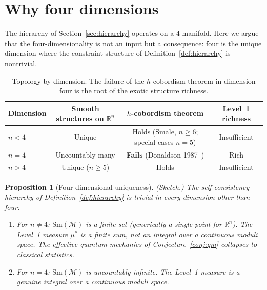 \documentclass[12pt,a4paper]{article}
\newtheorem{proposition}{Proposition}
\theoremstyle{definition}
\theoremstyle{remark}
\begin{document}
\section{Why four dimensions}
\label{sec:dimensions}

The hierarchy of Section~\ref{sec:hierarchy} operates on a 4-manifold.
Here we argue that the four-dimensionality is not an input but a
consequence: four is the unique dimension where the constraint structure
of Definition~\ref{def:hierarchy} is nontrivial.

\begin{table}[h]
\centering
\begin{tabular}{lccc}
\toprule
Dimension & Smooth structures on $\mathbb{R}^n$ & $h$-cobordism theorem & Level~1 richness \\
\midrule
$n < 4$ & Unique & Holds (Smale, $n \geq 6$; special cases $n = 5$) & Insufficient \\
$n = 4$ & Uncountably many & \textbf{Fails} (Donaldson 1987~\cite{donaldson_hcob}) & Rich \\
$n > 4$ & Unique ($n \geq 5$) & Holds & Insufficient \\
\bottomrule
\end{tabular}
\caption{Topology by dimension. The failure of the $h$-cobordism theorem in
dimension four is the root of the exotic structure richness.}
\label{tab:dimensions}
\end{table}

\begin{proposition}[Four-dimensional uniqueness]
\emph{(Sketch.)}
\label{prop:4d}
The self-consistency hierarchy of Definition~\ref{def:hierarchy} is trivial
in every dimension other than four:
\begin{enumerate}
\item For $n \neq 4$: $\mathrm{Sm}(\mathcal{M})$ is a finite set
(generically a single point for $\mathbb{R}^n$). The Level~1 measure
$\mu^*$ is a finite sum, not an integral over a continuous moduli space.
The effective quantum mechanics of Conjecture~\ref{conj:qm} collapses to
classical statistics.

\item For $n = 4$: $\mathrm{Sm}(\mathcal{M})$ is uncountably infinite.
The Level~1 measure is a genuine integral over a continuous moduli space.
\end{enumerate}
\end{proposition}
\end{document}
